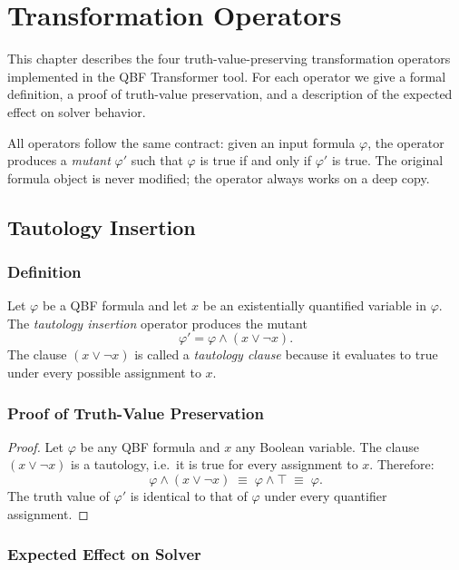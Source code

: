 \chapter{Transformation Operators}\label{cha:operators}

This chapter describes the four truth-value-preserving transformation operators implemented in the QBF Transformer tool. For each operator we give a formal definition, a proof of truth-value preservation, and a description of the expected effect on solver behavior.

All operators follow the same contract: given an input formula $\varphi$, the operator produces a \emph{mutant} $\varphi'$ such that $\varphi$ is true if and only if $\varphi'$ is true. The original formula object is never modified; the operator always works on a deep copy.

\section{Tautology Insertion}\label{sec:tautology}

\subsection{Definition}

Let $\varphi$ be a QBF formula and let $x$ be an existentially quantified variable in $\varphi$. The \emph{tautology insertion} operator produces the mutant
\[
  \varphi' = \varphi \land (x \lor \lnot x).
\]
The clause $(x \lor \lnot x)$ is called a \emph{tautology clause} because it evaluates to true under every possible assignment to $x$.

\subsection{Proof of Truth-Value Preservation}

\begin{proof}
Let $\varphi$ be any QBF formula and $x$ any Boolean variable.
The clause $(x \lor \lnot x)$ is a tautology, i.e.\ it is true for every assignment to $x$.
Therefore:
\[
  \varphi \land (x \lor \lnot x) \;\equiv\; \varphi \land \top \;\equiv\; \varphi.
\]
The truth value of $\varphi'$ is identical to that of $\varphi$ under every quantifier assignment.
\end{proof}

\subsection{Expected Effect on Solver}

